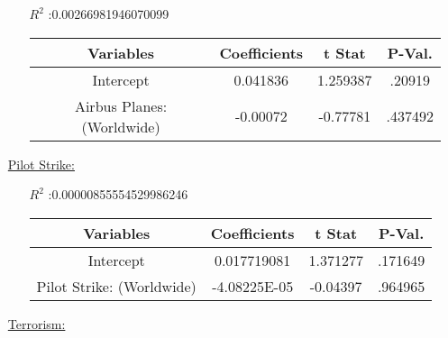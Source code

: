 \documentclass[12pt]{report}
\begin{document}
\begin{enumerate}
\begin{samepage}
        \begin{enumerate}
            \item[$R^2$]:0.00266981946070099
            \item[]
                \begin{tabular}{|c|c|c|c|}

                \toprule \hline
                \textbf{Variables} & \textbf{Coefficients}  & \textbf{t Stat}& \textbf{P-Val.} \\ \hline

                Intercept & 0.041836 &  1.259387 &.20919 \\ \hline
                Airbus Planes: (Worldwide) & -0.00072 &  -0.77781&.437492 & \\ \hline
                \bottomrule
                \end{tabular}

        \end{enumerate}
\end{samepage}
    \item[\underline{Pilot Strike:}]
 \begin{samepage}


        \begin{enumerate}
            \item[$R^2$]:0.00000855554529986246
            \item[]
                \begin{tabular}{|c|c|c|c|}



        \toprule \hline
        \textbf{Variables} & \textbf{Coefficients}  & \textbf{t Stat} & \textbf{P-Val.}\\ \hline

        Intercept & 0.017719081 &  1.371277& .171649 \\ \hline
        Pilot Strike: (Worldwide) & -4.08225E-05  & -0.04397 &.964965 \\ \hline
        \bottomrule

                \end{tabular}

        \end{enumerate}
\end{samepage}

    \item[\underline{Terrorism:}]
\end{enumerate}
\end{document}
